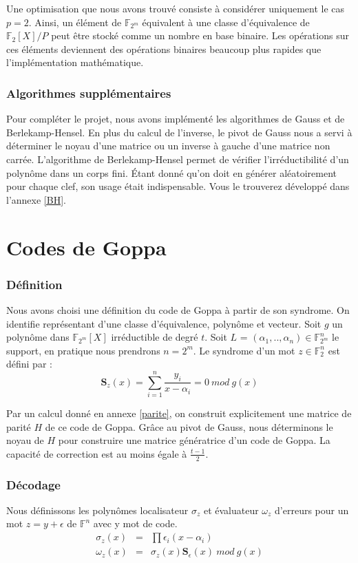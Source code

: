 \documentclass{article}
\begin{document}
			Une optimisation que nous avons trouvé consiste à considérer uniquement le cas $p = 2$.
			Ainsi, un élément de $\mathbb{F}_{2^{m}}$ équivalent à une classe d'équivalence de $\mathbb{F}_{2}[X]/P$ peut être stocké comme un nombre en base binaire.
			Les opérations sur ces éléments deviennent des opérations binaires beaucoup plus rapides que l'implémentation mathématique.

		\section*{Algorithmes supplémentaires}
			Pour compléter le projet, nous avons implémenté les algorithmes de Gauss et de Berlekamp-Hensel.
			En plus du calcul de l'inverse, le pivot de Gauss nous a servi à déterminer le noyau d'une matrice ou un inverse à gauche d'une matrice non carrée.
			L'algorithme de Berlekamp-Hensel \cite{berlekamp} permet de vérifier l'irréductibilité d'un polynôme dans un corps fini.
			Étant donné qu'on doit en générer aléatoirement pour chaque clef, son usage était indispensable.
			Vous le trouverez développé dans l'annexe \ref{BH}.

	\part*{Codes de Goppa}

		\section*{Définition}
			\cite{finiasz}
			Nous avons choisi une définition du code de Goppa à partir de son syndrome.
			On identifie représentant d'une classe d'équivalence, polynôme et vecteur.
			Soit $g$ un polynôme dans $\mathbb{F}_{2^{m}}[X]$ irréductible de degré $t$.
			Soit $L$ = $ (\alpha_{1},..,\alpha_{n})  \in \mathbb{F}_{2^{m}}^{n}$ le support, en pratique nous prendrons $n = 2^{m}$.
			Le syndrome d'un mot $z \in \mathbb{F}_{2}^{n}$ est défini par :
			$$
				\mathbf{S}_{z}(x) = \sum_{i=1}^{n} \frac{y_{i}}{x-\alpha_{i}} = 0 \ mod \ g(x)
			$$

			Par un calcul donné en annexe \ref{parite}, on construit explicitement une matrice de parité $H$ de ce code de Goppa.
			Grâce au pivot de Gauss, nous déterminons le noyau de $H$ pour construire une matrice génératrice d'un code de Goppa.
			La capacité de correction est au moins égale à $\frac{t-1}{2}$.


		\section*{Décodage}
			Nous définissons les polynômes localisateur $\sigma_{z}$ et évaluateur $\omega_{z}$ d'erreurs pour un mot $z = y + \epsilon$ de $\mathbb{F}^{n}$ avec y mot de code.
			\begin{eqnarray}
				\sigma_{z}(x) &=& \prod \epsilon_{i}(x - \alpha_{i}) \\
				\omega_{z}(x) &=& \sigma_{z}(x) \mathbf{S}_{\epsilon}(x) \ mod \ g(x)
			\end{eqnarray}
\end{document}
